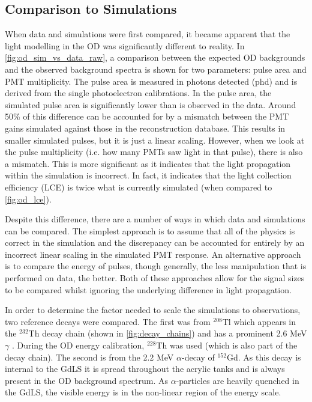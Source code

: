 

\subsection{Comparison to Simulations}
\par

When data and simulations were first compared, it became apparent that the light modelling in the OD was significantly different to reality.
In \autoref{fig:od_sim_vs_data_raw}, a comparison between the expected OD backgrounds and the observed background spectra is shown for two parameters: pulse area and PMT multiplicity.
The pulse area is measured in photons detected (phd) and is derived from the single photoelectron calibrations.
In the pulse area, the simulated pulse area is significantly lower than is observed in the data.
Around 50\% of this difference can be accounted for by a mismatch between the PMT gains simulated against those in the reconstruction database.
This results in smaller simulated pulses, but it is just a linear scaling.
However, when we look at the pulse multiplicity (i.e. how many PMTs saw light in that pulse), there is also a mismatch.
This is more significant as it indicates that the light propagation within the simulation is incorrect.
In fact, it indicates that the light collection efficiency (LCE) is twice what is currently simulated (when compared to \autoref{fig:od_lce}).



\par
Despite this difference, there are a number of ways in which data and simulations can be compared.
The simplest approach is to assume that all of the physics is correct in the simulation and the discrepancy can be accounted for entirely by an incorrect linear scaling in the simulated PMT response.
An alternative approach is to compare the energy of pulses, though generally, the less manipulation that is performed on data, the better.
Both of these approaches allow for the signal sizes to be compared whilst ignoring the underlying difference in light propagation.

\par
In order to determine the factor needed to scale the simulations to observations, two reference decays were compared.
The first was from ${}^{208}$Tl which appears in the ${}^{232}$Th decay chain (shown in \autoref{fig:decay_chains}) and has a prominent 2.6 MeV $\gamma$ \cite{radon_chains_ref}.
During the OD energy calibration, ${}^{228}$Th was used (which is also part of the decay chain).
The second is from the 2.2 MeV $\alpha$-decay of ${}^{152}$Gd.
As this decay is internal to the GdLS it is spread throughout the acrylic tanks and is always present in the OD background spectrum.
As $\alpha$-particles are heavily quenched in the GdLS, the visible energy is in the non-linear region of the energy scale.

